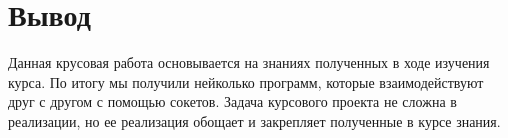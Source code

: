 \documentclass[pdf, unicode, 12pt, a4paper,oneside,fleqn]{article}
\begin{document}
\pagebreak

\section{Вывод}

Данная крусовая работа основывается на знаниях полученных в ходе изучения курса. По итогу мы получили нейколько программ, которые взаимодействуют друг с другом с помощью сокетов.
Задача курсового проекта не сложна в реализации, но ее реализация обощает и закрепляет полученные в курсе знания.
\end{document}
